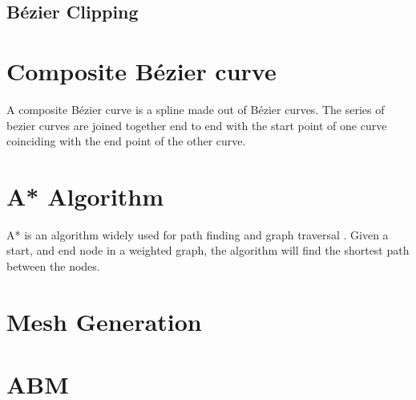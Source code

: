 \subsection{Bézier Clipping}

\section{Composite Bézier curve}
A composite Bézier curve is a spline made out of Bézier curves. The series of bezier curves are joined together end to end with the start point of one curve coinciding with the end point of the other curve.

\section{A* Algorithm}
A* is an algorithm widely used for path finding and graph traversal \cite{A-Star-Algorithm}. Given a start, and end node in a weighted graph, the algorithm will find the shortest path between the nodes. 
\section {Mesh Generation}

\section{ABM}

